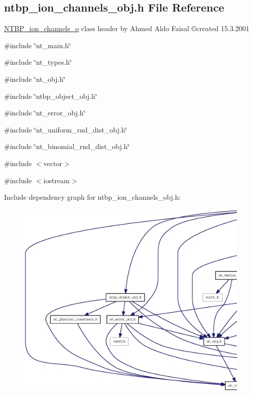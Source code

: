 \subsection{ntbp\_\-ion\_\-channels\_\-obj.h File Reference}
\label{ntbp__ion__channels__obj_8h}



\begin{DoxyItemize}
\item \hyperlink{class_n_t_b_p__ion__channels__o}{NTBP\_\-ion\_\-channels\_\-o} class header by Ahmed Aldo Faisal \copyright created 15.3.2001 
\end{DoxyItemize} 


{\ttfamily \#include \char`\"{}nt\_\-main.h\char`\"{}}\par
{\ttfamily \#include \char`\"{}nt\_\-types.h\char`\"{}}\par
{\ttfamily \#include \char`\"{}nt\_\-obj.h\char`\"{}}\par
{\ttfamily \#include \char`\"{}ntbp\_\-object\_\-obj.h\char`\"{}}\par
{\ttfamily \#include \char`\"{}nt\_\-error\_\-obj.h\char`\"{}}\par
{\ttfamily \#include \char`\"{}nt\_\-uniform\_\-rnd\_\-dist\_\-obj.h\char`\"{}}\par
{\ttfamily \#include \char`\"{}nt\_\-binomial\_\-rnd\_\-dist\_\-obj.h\char`\"{}}\par
{\ttfamily \#include $<$vector$>$}\par
{\ttfamily \#include $<$iostream$>$}\par
Include dependency graph for ntbp\_\-ion\_\-channels\_\-obj.h:
\nopagebreak
\begin{figure}[H]
\begin{center}
\leavevmode
\includegraphics[width=400pt]{ntbp__ion__channels__obj_8h__incl}
\end{center}
\end{figure}
